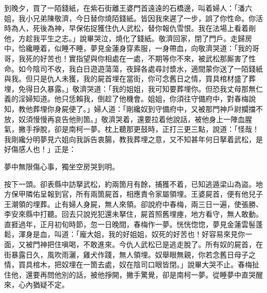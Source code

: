 到晚夕，買了一陌錢紙，在紫石街離王婆門首遠遠的石橋邊，叫着婦人：「潘六姐，我小兄弟陳敬濟，今日替你燒陌錢紙。皆因我來遲了一步，誤了你性命。你活時為人，死後為神，早保佑捉獲住仇人武松，替你報仇雪恨。我在法場上看着剮他，方趁我平生之志。」說畢哭泣，燒化了錢紙。敬濟回家，閉了門戶。走歸房中，恰纔睡着，似睡不睡，夢見金蓮身穿素服，一身帶血，向敬濟哭道：「我的哥哥，我死的好苦也！實指望與你相處在一處，不期等你不來，被武松那厮害了性命。如今陰司不收，我白日遊遊蕩蕩，夜歸各處尋討漿水，適間蒙你送了一陌錢紙與我。但只是仇人未獲，我的屍首埋在當街，你可念舊日之情，買具棺材盛了葬埋，免得日久暴露。」敬濟哭道：「我的姐姐，我可知要葬埋你。但恐我丈母那無仁義的淫婦知道。他只恁賴我，倒趁了他機會。姐姐，你須往守備府中，對春梅說知，教他葬埋你身屍便了。」婦人道：「剛纔奴到守備府中，又被那門神戶尉攔擋不放，奴須慢慢再哀告他則箇。」敬濟哭着，還要拉着他說話，被他身上一陣血腥氣，撇手掙脫，卻是南柯一夢。枕上聽那更鼓時，正打三更三點，說道：「怪哉！我剛纔分明夢見六姐向我訴告衷腸，教我葬埋之意，又不知甚年何日拏着武松，是好傷感人也！」正是：

\begin{myquote}
夢中無限傷心事，獨坐空房哭到明。
\end{myquote}

按下一頭。卻表縣中訪拏武松，約兩箇月有餘，捕獲不着，已知逃遁梁山為盜。地方保甲隣佑呈報到官，所有兩箇屍首，相應責令家屬領埋。王婆屍首，便有他兒子王潮領的埋葬。止有婦人身屍，無人來領。卻說府中春梅，兩三日一遍，使張勝、李安來縣中打聽。回去只說兇犯還未拏住，屍首照舊埋瘞，地方看守，無人敢動。直捱過年，正月初旬時節，忽一日晚間，春梅作一夢。恍恍惚惚，夢見金蓮雲髻蓬鬆，渾身是血，叫道：「龐大姐，我的好姐姐，奴死的好苦也！好容易來見你一面，又被門神把住嗔喝，不敢進來。今仇人武松已是逃走脫了。所有奴的屍首，在街暴露日久，風吹雨灑，雞犬作踐，無人領埋。奴舉眼無親，你若念舊日母子之情，買具棺木，把奴埋在一箇去處，奴在陰司口眼皆閉。」{}說畢大哭不止。春梅扯住他，還要再問他別的話，被他掙開，撇手驚覺，卻是南柯一夢。從睡夢中直哭醒來，心內猶疑不定。

